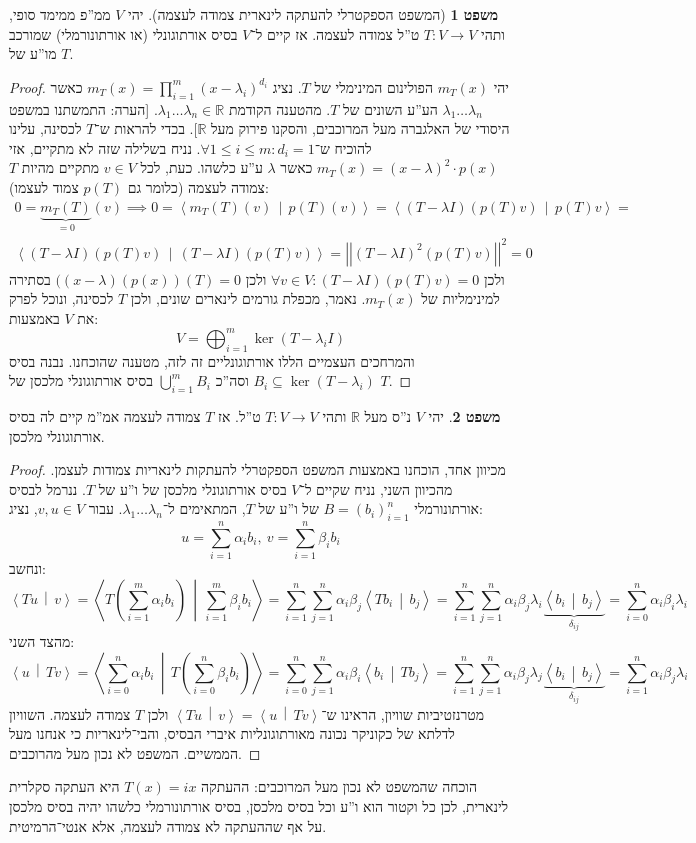 \documentclass[a4paper]{article}
\newcommand\R     {\mathbb{R}}
\newcommand\ra    {\rangle}
\newcommand\la    {\langle}
\newcommand\sumni     {\sum_{i = 0}^{n}}
\newcommand\co        {\colon}
\newcommand\norm[1]   {\left \vert \left \vert #1 \right \vert \right \vert}
\newcommand\mut [2]   {\left \la #1 \,\middle\vert\, #2 \right \ra}
\newcommand\ag        {\alpha}
\newcommand\bg        {\beta}
\newcommand\dg        {\delta}
\renewcommand\lg      {\lambda}
\newcommand\cl [1]    {\left ( #1 \right )}
\theoremstyle{definition}
\newtheorem{Theorem}{\color{myblue}משפט}
\newcommand\theo  [1] {\begin{Theorem}#1\end{Theorem}}
\begin{document}
	\begin{Theorem}[המשפט הספקטרלי להעתקה לינארית צמודה לעצמה]
		יהי $V$ ממ''פ ממימד סופי, ותהי $T \co V \to V$ ט''ל צמודה לעצמה. אז קיים ל־$V$ בסיס אורתוגונלי (או אורתונורמלי) שמורכב מו''ע של $T$. 
	\end{Theorem} \begin{proof}
		יהי $m_T(x)$ הפולינום המינימלי של $T$. נציג $m_T(x) = \prod_{i = 1}^{m}(x - \lg_i)^{d_i}$ כאשר $\lg_1 \dots \lg_n$ הע''ע השונים של $T$. מהטענה הקודמת $\lg_1 \dots \lg_n \in \R$. [הערה: התמשתנו במשפט היסודי של האלגברה מעל המרוכבים, והסקנו פירוק מעל $\R$]. בכדי להראות ש־$T$ לכסינה, עלינו להוכיח ש־$\forall 1 \le i \le m \co d_i = 1$. נניח בשלילה שזה לא מתקיים, אזי $m_T(x) = (x - \lg)^2 \cdot p(x)$ כאשר $\lg$ ע''ע כלשהו. כעת, לכל $v \in V$ מתקיים מהיות $T$ צמודה לעצמה (כלומר גם $p(T)$ צמוד לעצמו): 
		\begin{multline*}
			0 = \underbrace{m_T(T)}_{=0}(v) \implies 0 = \mut{m_T(T)(v)}{p(T)(v)} = \mut{(T - \lg I)(p(T)v)}{p(T)v} =\\ \mut{(T - \lg I)(p(T)v)}{(T - \lg I)(p(T)v)} = \norm{(T - \lg I)^2(p(T)v)}^2 = 0
		\end{multline*}
		ולכן $\forall v \in V \co (T - \lg I)(p(T)v) = 0$ ולכן $((x - \lg)(p(x))(T) = 0$ בסתירה למינימליות של $m_T(x)$. נאמר, מכפלת גורמים לינארים שונים, ולכן $T$ לכסינה, ונוכל לפרק את $V$ באמצעות: 
		\[ V = \bigoplus_{i = 1}^{m} \ker (T - \lg_i I) \]
		והמרחכים העצמיים הללו אורתוגונליים זה לזה, מטענה שהוכחנו. 
		נבנה בסיס $B_i \subseteq \ker (T - \lg_i)$ וסה''כ $\bigcup_{i = 1}^{m} B_i$ בסיס אורתוגונלי מלכסן של $T$. 
	\end{proof}
	\theo{יהי $V$ נ''ס מעל $\R$ ותהי $T \co V \to V$ ט''ל. אז $T$ צמודה לעצמה אמ''מ קיים לה בסיס אורתוגונלי מלכסן. }\begin{proof}
		מכיוון אחד, הוכחנו באמצעות המשפט הספקטרלי להעתקות לינאריות צמודות לעצמן. 
		מהכיוון השני, נניח שקיים ל־$V$ בסיס אורתוגונלי מלכסן של ו''ע של $T$. ננרמל לבסיס אורתונורמלי $B = (b_i)_{i = 1}^{n}$ של ו''ע של $T$, המתאימים ל־$\lg_1 \dots \lg_n$. עבור $v, u \in V$, נציג: 
		\[ u = \sum_{i = 1}^{n}\ag_i b_i, \ v = \sum_{i = 1}^{n}\bg_i b_i \]
		ונחשב: 
		\[ \mut{Tu}{v} = \mut{T\cl{\sum_{i = 1}^{m}\ag_i b_i}}{\sum_{i = 1}^{m}\bg_i b_i} = \sum_{i = 1}^{n}\sum_{j = 1}^{n}\ag_i \bg_j \mut{T b_i}{b_j} = \sum_{i = 1}^{n}\sum_{j = 1}^{n}\ag_i \bg_j \lg_i \underbrace{\mut{b_i}{b_j}}_{\dg_{ij}} = \sumni \ag_i \bg_i \lg_i \]
		מהצד השני: 
		\[ \mut{u}{Tv} = \mut{\sumni \ag_i b_i}{T\cl{\sumni \bg_i b_i}} = \sumni \sum_{j = 1}^{n}\ag_i \bg_i \mut{b_i}{Tb_j} = \sum_{i = 1}^{n}\sum_{j = 1}^{n}\ag_i \bg_j \lg_j \underbrace{\mut{b_i}{b_j}}_{\dg_{ij}} = \sum_{i = 1}^{n}\ag_i \bg_j \lg_i \]
		מטרנזטיביות שוויון, הראינו ש־$\mut{Tu}{v} = \mut{u}{Tv}$ ולכן $T$ צמודה לעצמה. השוויון לדלתא של כקוניקר נכונה מאורתוגונליות איברי הבסיס, והבי־לינאריות כי אנחנו מעל הממשיים. המשפט לא נכון מעל מהרוכבים. 
	\end{proof}
	הוכחה שהמשפט לא נכון מעל המרוכבים: ההעתקה $T(x) = ix$ היא העתקה סקלרית לינארית, לכן כל וקטור הוא ו''ע וכל בסיס מלכסן, בסיס אורתונורמלי כלשהו יהיה בסיס מלכסן על אף שההעתקה לא צמודה לעצמה, אלא אנטי־הרמיטית. 
	
\end{document}
